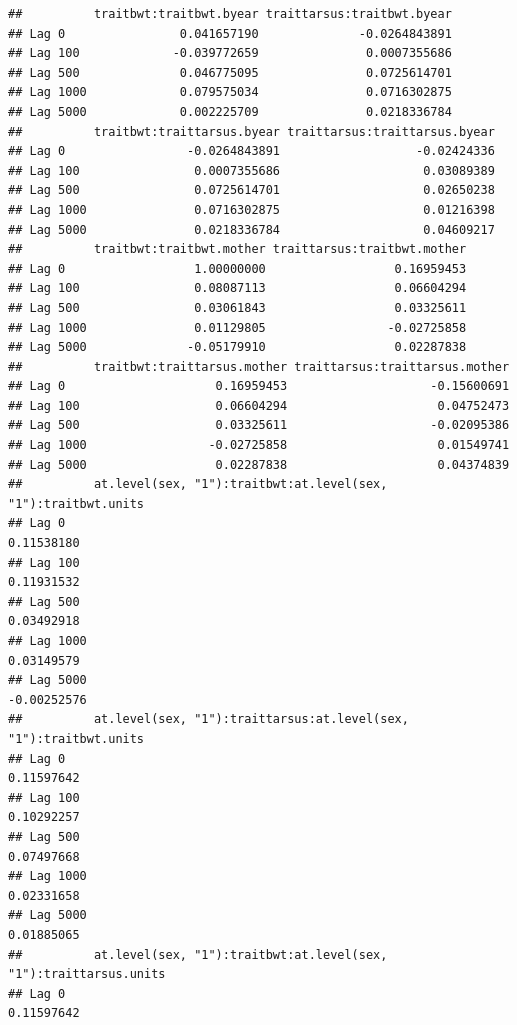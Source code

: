 \documentclass[
  12pt,
]{book}
\begin{document}
\begin{verbatim}
##          traitbwt:traitbwt.byear traittarsus:traitbwt.byear
## Lag 0                0.041657190              -0.0264843891
## Lag 100             -0.039772659               0.0007355686
## Lag 500              0.046775095               0.0725614701
## Lag 1000             0.079575034               0.0716302875
## Lag 5000             0.002225709               0.0218336784
##          traitbwt:traittarsus.byear traittarsus:traittarsus.byear
## Lag 0                 -0.0264843891                   -0.02424336
## Lag 100                0.0007355686                    0.03089389
## Lag 500                0.0725614701                    0.02650238
## Lag 1000               0.0716302875                    0.01216398
## Lag 5000               0.0218336784                    0.04609217
##          traitbwt:traitbwt.mother traittarsus:traitbwt.mother
## Lag 0                  1.00000000                  0.16959453
## Lag 100                0.08087113                  0.06604294
## Lag 500                0.03061843                  0.03325611
## Lag 1000               0.01129805                 -0.02725858
## Lag 5000              -0.05179910                  0.02287838
##          traitbwt:traittarsus.mother traittarsus:traittarsus.mother
## Lag 0                     0.16959453                    -0.15600691
## Lag 100                   0.06604294                     0.04752473
## Lag 500                   0.03325611                    -0.02095386
## Lag 1000                 -0.02725858                     0.01549741
## Lag 5000                  0.02287838                     0.04374839
##          at.level(sex, "1"):traitbwt:at.level(sex, "1"):traitbwt.units
## Lag 0                                                       0.11538180
## Lag 100                                                     0.11931532
## Lag 500                                                     0.03492918
## Lag 1000                                                    0.03149579
## Lag 5000                                                   -0.00252576
##          at.level(sex, "1"):traittarsus:at.level(sex, "1"):traitbwt.units
## Lag 0                                                          0.11597642
## Lag 100                                                        0.10292257
## Lag 500                                                        0.07497668
## Lag 1000                                                       0.02331658
## Lag 5000                                                       0.01885065
##          at.level(sex, "1"):traitbwt:at.level(sex, "1"):traittarsus.units
## Lag 0                                                          0.11597642

\end{verbatim}
\end{document}
